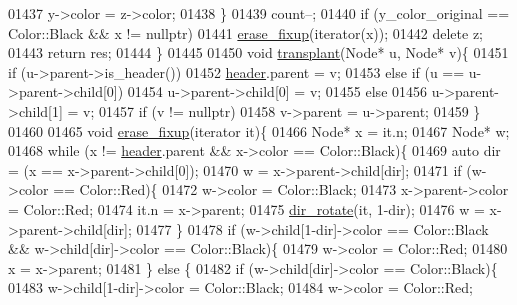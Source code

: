 \begin{DoxyCode}
01437             y->color = z->color;
01438         \}
01439         count--;
01440         \textcolor{keywordflow}{if} (y\_color\_original == Color::Black && x != \textcolor{keyword}{nullptr})
01441             \hyperlink{classaed2_1_1map_a7870c8f26e82b00d0aeb2e9f331dfec6_a7870c8f26e82b00d0aeb2e9f331dfec6}{erase_fixup}(iterator(x));
01442         \textcolor{keyword}{delete} z;
01443         \textcolor{keywordflow}{return} res;
01444     \}
01445 
01450     \textcolor{keywordtype}{void} \hyperlink{classaed2_1_1map_a98b9f200c64ce02dfb67902ee00e375a_a98b9f200c64ce02dfb67902ee00e375a}{transplant}(Node* u, Node* v)\{
01451         \textcolor{keywordflow}{if} (u->parent->is\_header())
01452             \hyperlink{classaed2_1_1map_a92d93f905c8ad73fba18fdc7e8915cce_a92d93f905c8ad73fba18fdc7e8915cce}{header}.parent = v;
01453         \textcolor{keywordflow}{else} if (u == u->parent->child[0])
01454             u->parent->child[0] = v;
01455         \textcolor{keywordflow}{else}
01456             u->parent->child[1] = v;
01457         \textcolor{keywordflow}{if} (v != \textcolor{keyword}{nullptr})
01458             v->parent = u->parent;
01459     \}
01460 
01465     \textcolor{keywordtype}{void} \hyperlink{classaed2_1_1map_a7870c8f26e82b00d0aeb2e9f331dfec6_a7870c8f26e82b00d0aeb2e9f331dfec6}{erase_fixup}(iterator it)\{
01466         Node* x = it.n;
01467         Node* w;
01468         \textcolor{keywordflow}{while} (x != \hyperlink{classaed2_1_1map_a92d93f905c8ad73fba18fdc7e8915cce_a92d93f905c8ad73fba18fdc7e8915cce}{header}.parent && x->color == Color::Black)\{
01469             \textcolor{keyword}{auto} dir = (x == x->parent->child[0]);
01470             w = x->parent->child[dir];
01471             \textcolor{keywordflow}{if} (w->color == Color::Red)\{
01472                 w->color = Color::Black;
01473                 x->parent->color = Color::Red;
01474                 it.n = x->parent;
01475                 \hyperlink{classaed2_1_1map_a94f2862ada0c9ed4f4457eac42ea8f23_a94f2862ada0c9ed4f4457eac42ea8f23}{dir_rotate}(it, 1-dir);
01476                 w = x->parent->child[dir];
01477             \}
01478             \textcolor{keywordflow}{if} (w->child[1-dir]->color == Color::Black && w->child[dir]->color 
      == Color::Black)\{
01479                 w->color = Color::Red;
01480                 x = x->parent;
01481             \} \textcolor{keywordflow}{else} \{
01482                 \textcolor{keywordflow}{if} (w->child[dir]->color == Color::Black)\{
01483                     w->child[1-dir]->color = Color::Black;
01484                     w->color = Color::Red;

\end{DoxyCode}
